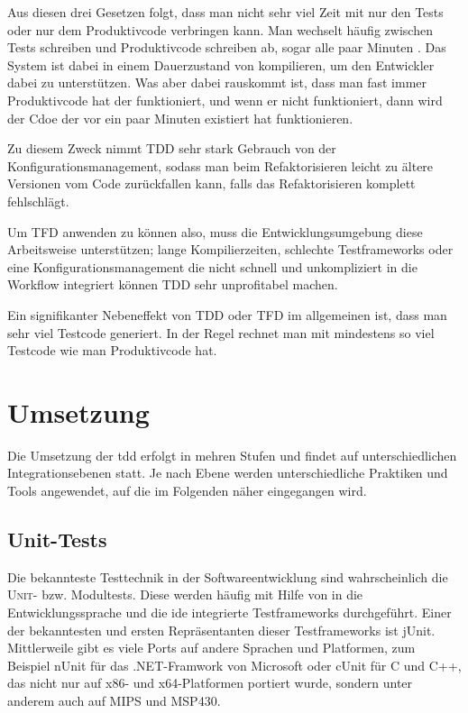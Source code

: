 \documentclass{mitschrift}
\newcommand{\pje}{\marginpar{Philipp\\Jeske}}
\begin{document}
Aus diesen drei Gesetzen folgt, dass man nicht sehr viel Zeit mit nur den Tests
oder nur dem Produktivcode verbringen kann. Man wechselt häufig zwischen Tests
schreiben und Produktivcode schreiben ab, sogar alle paar Minuten
\cite{itAgile, UncleBob}. Das System ist dabei in einem Dauerzustand von
kompilieren, um den Entwickler dabei zu unterstützen. Was aber dabei rauskommt
ist, dass man fast immer Produktivcode hat der funktioniert, und wenn er nicht
funktioniert, dann wird der Cdoe der vor ein paar Minuten existiert hat
funktionieren.

Zu diesem Zweck nimmt TDD sehr stark Gebrauch von der Konfigurationsmanagement,
sodass man beim Refaktorisieren leicht zu ältere Versionen vom Code
zurückfallen kann, falls das Refaktorisieren komplett fehlschlägt.

Um TFD anwenden zu können also, muss die Entwicklungsumgebung diese
Arbeitsweise unterstützen; lange Kompilierzeiten, schlechte Testframeworks oder
eine Konfigurationsmanagement die nicht schnell und unkompliziert in die
Workflow integriert können TDD sehr unprofitabel machen.

Ein signifikanter Nebeneffekt von TDD oder TFD im allgemeinen ist, dass man
sehr viel Testcode generiert. In der Regel rechnet man mit mindestens so viel
Testcode wie man Produktivcode hat. \cite{SQlite3, C2}

\chapter{Umsetzung}\label{Umsetzung}\pje
Die Umsetzung der \gls{tdd} erfolgt in mehren Stufen und findet auf
unterschiedlichen Integrationsebenen statt. Je nach Ebene werden
unterschiedliche Praktiken und Tools angewendet, auf die im Folgenden näher
eingegangen wird.

\section{Unit-Tests}
Die bekannteste Testtechnik in der Softwareentwicklung sind wahrscheinlich die
\textsc{Unit}- bzw. Modultests. Diese werden häufig mit Hilfe von in die
Entwicklungssprache und die \gls{ide} integrierte Testframeworks durchgeführt.
Einer der bekanntesten und ersten Repräsentanten dieser Testframeworks ist
jUnit. Mittlerweile gibt es viele Ports auf andere Sprachen und Platformen, zum
Beispiel nUnit für das .NET-Framwork von Microsoft oder cUnit für C und C++,
das nicht nur auf x86- und x64-Platformen portiert wurde, sondern unter anderem
auch auf MIPS und MSP430.
\end{document}
